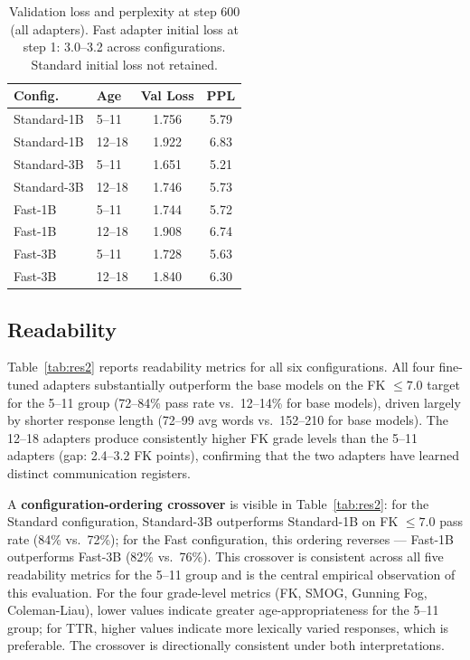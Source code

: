 \documentclass[journal]{IEEEtai}
\begin{document}
\begin{table}[!t]
  \centering
  \caption{Validation loss and perplexity at step 600 (all adapters). Fast adapter initial loss at step 1: 3.0--3.2 across configurations. Standard initial loss not retained.}
  \label{tab:res1}
  \small
  \begin{tabular}{llcc}
    \hline
    Config. & Age & Val Loss & PPL \\
    \hline
    Standard-1B & 5--11  & 1.756 & 5.79 \\
    Standard-1B & 12--18 & 1.922 & 6.83 \\
    Standard-3B & 5--11  & 1.651 & 5.21 \\
    Standard-3B & 12--18 & 1.746 & 5.73 \\
    Fast-1B     & 5--11  & 1.744 & 5.72 \\
    Fast-1B     & 12--18 & 1.908 & 6.74 \\
    Fast-3B     & 5--11  & 1.728 & 5.63 \\
    Fast-3B     & 12--18 & 1.840 & 6.30 \\
    \hline
  \end{tabular}
\end{table}

\subsection{Readability}

Table~\ref{tab:res2} reports readability metrics for all six configurations. All four fine-tuned adapters substantially outperform the base models on the FK $\leq 7.0$ target for the 5--11 group (72--84\% pass rate vs.\ 12--14\% for base models), driven largely by shorter response length (72--99 avg words vs.\ 152--210 for base models). The 12--18 adapters produce consistently higher FK grade levels than the 5--11 adapters (gap: 2.4--3.2 FK points), confirming that the two adapters have learned distinct communication registers.

A \textbf{configuration-ordering crossover} is visible in Table~\ref{tab:res2}: for the Standard configuration, Standard-3B outperforms Standard-1B on FK $\leq 7.0$ pass rate (84\% vs.\ 72\%); for the Fast configuration, this ordering reverses --- Fast-1B outperforms Fast-3B (82\% vs.\ 76\%). This crossover is consistent across all five readability metrics for the 5--11 group and is the central empirical observation of this evaluation. For the four grade-level metrics (FK, SMOG, Gunning Fog, Coleman-Liau), lower values indicate greater age-appropriateness for the 5--11 group; for TTR, higher values indicate more lexically varied responses, which is preferable. The crossover is directionally consistent under both interpretations.
\end{document}
